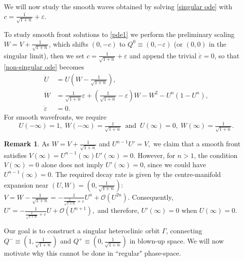 \documentclass{article}
\theoremstyle{definition}
\numberwithin{equation}{section}
\newtheorem{remark}[prop]{Remark}
\begin{document}
We will now study the smooth waves obtained by solving \eqref{singular ode} with $c=\tfrac{1}{\sqrt{1+n}}+\varepsilon$.



To study smooth front solutions to \eqref{pde1} we perform the preliminary scaling $W=V+\tfrac{1}{\sqrt{1+n}}$, which shifts $\left(0, -c\right)$ to $Q^0\equiv(0, -\varepsilon)$ (or $(0,0)$ in the singular limit), then we set $c=\tfrac{1}{\sqrt{1+n}}+\varepsilon$ and append the trivial $\dot{\varepsilon}=0$, so that \eqref{non-singular ode} becomes
\begin{equation}
    \begin{aligned}
        \dot{U} &=U\left(W-\tfrac{1}{\sqrt{1+n}}\right),\\
        \dot{W} &=\tfrac{1}{\sqrt{1+n}}\varepsilon+\left(\tfrac{1}{\sqrt{1+n}}-\varepsilon\right)W-W^2-U^n(1-U^n),\\
        \dot{\varepsilon}&=0.
        \label{ode epsilon}
    \end{aligned}
\end{equation}
For smooth wavefronts, we require
$$U(-\infty)=1,\;W(-\infty)=\tfrac{1}{\sqrt{1+n}} \;\;\text{and}\;\; U(\infty)=0,\;W(\infty)=\tfrac{1}{\sqrt{1+n}}.$$
\begin{remark}
As $W=V+\tfrac{1}{\sqrt{1+n}}$ and $U^{n-1} U'=V,$
we claim that a smooth front satisfies
$V(\infty)=U^{n-1}(\infty)U'(\infty)=0.$ However, for $n>1$, the condition $V(\infty)=0$ alone does not imply $U'(\infty)=0$, since we could have $U^{n-1}(\infty)=0.$ The required decay rate is given by the
centre-manifold expansion near $(U,W)=\left(0, \tfrac{1}{\sqrt{1+n}}\right)$: $V=W-\tfrac{1}{\sqrt{1+n}}=-\tfrac{1}{\tfrac{1}{\sqrt{1+n}}+\varepsilon}U^n+\mathcal{O}(U^{2n}).$
Consequently,
$U'=-\tfrac{1}{\tfrac{1}{\sqrt{1+n}}+\varepsilon}U+\mathcal{O}(U^{n+1}),$
and therefore,  $U'(\infty)=0$ when $U(\infty)=0$.
\end{remark}

Our goal is to construct a singular heteroclinic orbit $\Gamma$, connecting $Q^-\equiv\left(1,\tfrac{1}{\sqrt{1+n}}\right)$ and $Q^+\equiv\left(0,\tfrac{1}{\sqrt{1+n}}\right)$ in blown-up space.
We will now motivate why this cannot be done in ``regular" phase-space.
\end{document}
